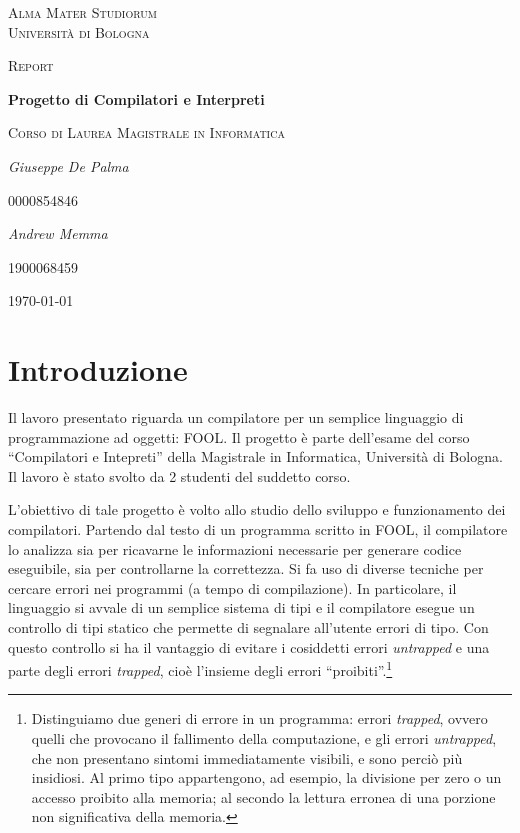 \documentclass{scrreprt}
\begin{document}
\begin{titlepage}
	\centering
	{\scshape\LARGE Alma Mater Studiorum\\Università di Bologna \par}
	\vspace{1cm}
	{\scshape\Large Report\par}
	\vspace{1.5cm}
    {\huge\bfseries Progetto di Compilatori e Interpreti\par}
    \vspace{0.5cm}
    {\scshape\Large Corso di Laurea Magistrale in Informatica\par}
	\vspace{2cm}
    {\Large\itshape Giuseppe De Palma\par}
    {\Large 0000854846\par}
	\vspace{0.5cm}    
    {\Large\itshape Andrew Memma\par}
    {\Large1900068459\par}
    \vfill
    
	{\large \today\par}
\end{titlepage}

\tableofcontents

\chapter{Introduzione}
Il lavoro presentato riguarda un compilatore per un semplice linguaggio di programmazione ad oggetti: FOOL. Il progetto è parte dell'esame del corso ``Compilatori e Intepreti'' della Magistrale in Informatica, Università di Bologna. Il lavoro è stato svolto da 2 studenti del suddetto corso.

L'obiettivo di tale progetto è volto allo studio dello sviluppo e funzionamento dei compilatori. Partendo dal testo di un programma scritto in FOOL, il compilatore lo analizza sia per ricavarne le informazioni necessarie per generare codice eseguibile, sia per controllarne la correttezza. 
Si fa uso di diverse tecniche per cercare errori nei programmi (a tempo di compilazione). In particolare, il linguaggio si avvale di un semplice sistema di tipi e il compilatore esegue un controllo di tipi statico che permette di segnalare all'utente errori di tipo. Con questo controllo si ha il vantaggio di evitare
i cosiddetti errori \textit{untrapped} e una parte degli errori \textit{trapped}, cioè l'insieme degli errori ``proibiti''.\footnote{Distinguiamo due generi di errore in un programma: errori \textit{trapped}, ovvero quelli che provocano il fallimento della computazione, e gli errori	\textit{untrapped}, che non	presentano sintomi immediatamente visibili, e sono perciò più insidiosi. 
Al primo tipo appartengono, ad esempio, la divisione per zero o un accesso proibito alla memoria; al secondo la lettura erronea di una porzione non significativa della memoria.}
\end{document}
